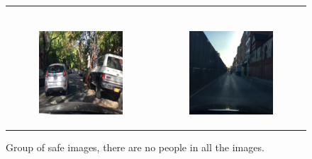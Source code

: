 \begin{figure}
\begin{tabular}{p{\horspace} p{\horspace}}
\begin{subfigure}[b]{\subfigwidth}
    \end{subfigure} \\
    \begin{subfigure}[b]{\subfigwidth}
        \includegraphics[width=\subfigwidth]{images/gpt4/s3.jpg}
    \end{subfigure}
    \hfill &
    \begin{subfigure}[b]{\subfigwidth}
        \includegraphics[width=\subfigwidth]{images/gpt4/s5.jpg}
    \end{subfigure}
\end{tabular}
\caption{Group of safe images, there are no people in all the images.}
\label{fig:sub_dangerous_group}
\end{figure}
